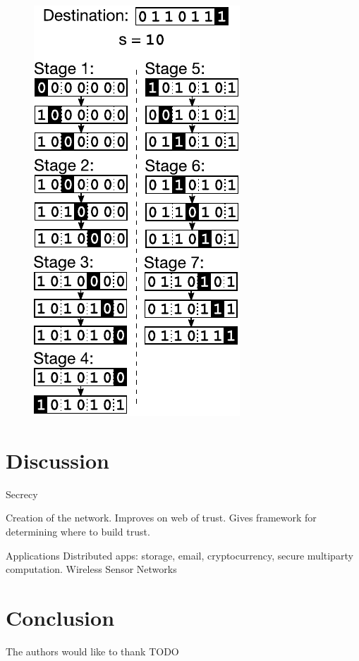 \documentclass[prodmode,permissions]{acmsmall-ec16}
\begin{document}
\begin{figure}
\begin{center}
\includegraphics{fig-routing.pdf}
\end{center}
\caption{
\label{fig:routing}
}
\end{figure}

\section{Discussion}

Secrecy

Creation of the network.
Improves on web of trust.
Gives framework for determining where to build trust.

Applications
Distributed apps: storage, email, cryptocurrency, secure multiparty computation.
Wireless Sensor Networks

\section{Conclusion}

\begin{acks}
The authors would like to thank TODO
\end{acks}



\end{document}
